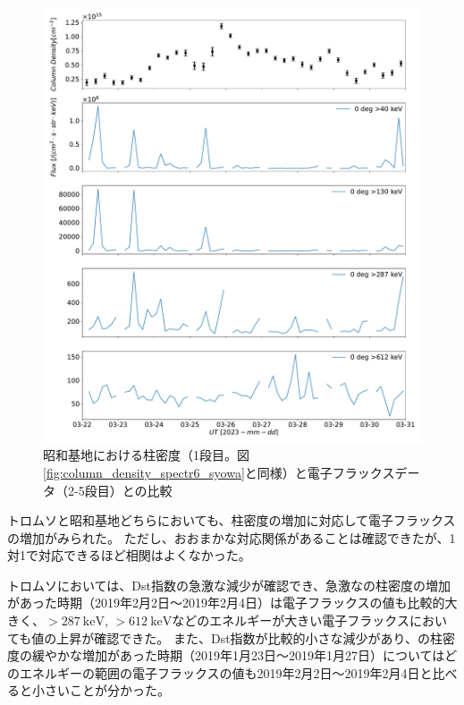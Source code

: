 \begin{figure}[htbp]
    \centering
    \includegraphics[width=\linewidth]{master_thesis_contents/master_thesis_fig/column_density_spectr6_poes0deg_syowa.pdf}
    \caption{昭和基地における柱密度（1段目。図\ref{fig:column_density_spectr6_syowa}と同様）と電子フラックスデータ（2-5段目）との比較}
    \label{fig:poes_mmcd_syowa}
\end{figure} \par

トロムソと昭和基地どちらにおいても、柱密度の増加に対応して電子フラックスの増加がみられた。
ただし、おおまかな対応関係があることは確認できたが、1対1で対応できるほど相関はよくなかった。\par

トロムソにおいては、Dst指数の急激な減少が確認でき、急激なの柱密度の増加があった時期（2019年2月2日〜2019年2月4日）は電子フラックスの値も比較的大きく、$>287\ \mathrm{keV}$, $>612\ \mathrm{keV}$などのエネルギーが大きい電子フラックスにおいても値の上昇が確認できた。
また、Dst指数が比較的小さな減少があり、の柱密度の緩やかな増加があった時期（2019年1月23日〜2019年1月27日）についてはどのエネルギーの範囲の電子フラックスの値も2019年2月2日〜2019年2月4日と比べると小さいことが分かった。\par

